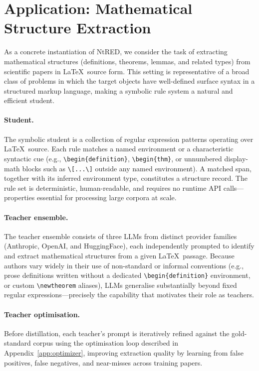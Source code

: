 \documentclass[11pt]{article}
\newtheorem{definition}{Definition}
\begin{document}
\section*{Application: Mathematical Structure Extraction}

As a concrete instantiation of NtRED, we consider the task of extracting mathematical structures
(definitions, theorems, lemmas, and related types) from scientific papers in
\LaTeX~source form. This setting is representative of a broad class of problems in which
the target objects have well-defined surface syntax in a structured markup language, making a
symbolic rule system a natural and efficient student.

\paragraph{Student.}
The symbolic student is a collection of regular expression patterns operating over
\LaTeX~source. Each rule matches a named environment or a characteristic
syntactic cue (e.g., \verb|\begin{definition}|, \verb|\begin{thm}|, or unnumbered
display-math blocks such as \verb|\[...\]| outside any named environment). A matched span,
together with its inferred environment type, constitutes a structure record.
The rule set is deterministic, human-readable, and requires no
runtime API calls---properties essential for processing large corpora at scale.

\paragraph{Teacher ensemble.}
The teacher ensemble consists of three LLMs from distinct provider families
(Anthropic, OpenAI, and HuggingFace), each independently prompted to identify and extract
mathematical structures from a given \LaTeX~passage. Because authors vary widely in their
use of non-standard or informal conventions (e.g., prose definitions written without a
dedicated \verb|\begin{definition}| environment, or custom \verb|\newtheorem| aliases), LLMs
generalise substantially beyond fixed regular expressions---precisely the capability that
motivates their role as teachers.

\paragraph{Teacher optimisation.}
Before distillation, each teacher's prompt is iteratively refined against the gold-standard
corpus using the optimisation loop described in Appendix~\ref{app:optimizer}, improving
extraction quality by learning from false positives, false negatives, and near-misses across
training papers.
\end{document}
